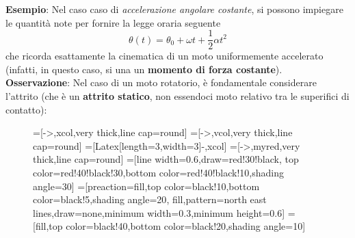 \documentclass[a4paper]{extarticle}
\begin{document}
\vspace{1em}
\noindent
\textbf{Esempio}: Nel caso caso di \emph{accelerazione angolare costante}, si possono impiegare le quantità note per fornire la legge oraria seguente
\[\boxed{\theta(t)=\theta_0+\omega t + \frac{1}{2}\alpha t^2}\]
che ricorda esattamente la cinematica di un moto uniformemente accelerato (infatti, in questo caso, si una un \textbf{momento di forza costante}).\\

\vspace{1em}
\noindent
\textbf{Osservazione}: Nel caso di un moto rotatorio, è fondamentale considerare l'attrito (che è un \textbf{attrito statico}, non essendoci moto relativo tra le superifici di contatto):

\begin{figure}[H]
  \centering
  =[->,xcol,very thick,line cap=round]
  =[->,vcol,very thick,line cap=round]
  =[{Latex[length=3,width=3]}-,xcol]
  =[->,myred,very thick,line cap=round]
  =[line width=0.6,draw=red!30!black, %
                    top color=red!40!black!30,bottom color=red!40!black!10,shading angle=30]
  =[preaction={fill,top color=black!10,bottom color=black!5,shading angle=20},
                      fill,pattern=north east lines,draw=none,minimum width=0.3,minimum height=0.6]
  =[fill,top color=black!40,bottom color=black!20,shading angle=10]
\end{figure}
\end{document}
